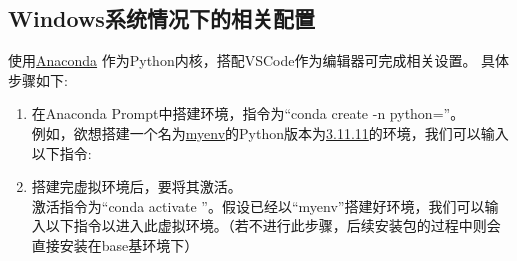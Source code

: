 \documentclass{article}
\begin{document}
		\subsection{Windows系统情况下的相关配置}
			使用\underline{Anaconda} 作为Python内核，搭配VSCode作为编辑器可完成相关设置。
			具体步骤如下:
			\begin{enumerate}
				\item 在Anaconda Prompt中搭建环境，指令为“conda create -n  python=”。\\
				例如，欲想搭建一个名为\underline{myenv}的Python版本为\underline{3.11.11}的环境，我们可以输入以下指令:
				\begin{center}
				\end{center}
				
				\item 搭建完虚拟环境后，要将其激活。\\
				激活指令为“conda activate ”。假设已经以“myenv”搭建好环境，我们可以输入以下指令以进入此虚拟环境。（若不进行此步骤，后续安装包的过程中则会直接安装在base基环境下）
				\begin{center}
				\end{center}
				

\end{enumerate}
\end{document}
